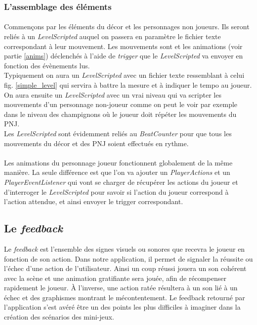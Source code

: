 \subsubsection{L'assemblage des éléments}

\paragraph{}
Commençons par les éléments du décor et les personnages non joueurs. Ils seront reliés à un \textit{LevelScripted} auquel on passera en paramètre le fichier texte correspondant à leur mouvement. Les mouvements sont et les animations (voir partie \ref{anims}) déclenchés à l'aide de \textit{trigger} que le \textit{LevelScripted} va envoyer en fonction des évènements lus. \\
Typiquement on aura un \textit{LevelScripted} avec un fichier texte ressemblant à celui fig. \ref{simple_level} qui servira à battre la mesure et à indiquer le tempo au joueur.\\
On aura ensuite un \textit{LevelScripted} avec un vrai niveau qui va scripter les mouvements d'un personnage non-joueur comme on peut le voir par exemple dans le niveau des champignons où le joueur doit répéter les mouvements du PNJ.\\
Les \textit{LevelScripted} sont évidemment reliés au \textit{BeatCounter} pour que tous les mouvements du décor et des PNJ soient effectués en rythme.

\paragraph{}
Les animations du personnage joueur fonctionnent globalement de la même manière. La seule différence est que l'on va ajouter un \textit{PlayerActions} et un \textit{PlayerEventListener} qui vont se charger de récupérer les actions du joueur et d'interroger le \textit{LevelScripted} pour savoir si l'action du joueur correspond à l'action attendue, et ainsi envoyer le trigger correspondant. 

\subsection{Le \textit{feedback}}

Le \textit{feedback} est l'ensemble des signes visuels ou sonores que recevra le joueur en fonction de son action. Dans notre application, il permet de signaler la réussite ou l'échec d'une action de l'utilisateur. Ainsi un coup réussi jouera un son cohérent avec la scène et une animation gratifiante sera jouée, afin de récompenser rapidement le joueur. À l'inverse, une action ratée résultera à un son lié à un échec et des graphismes montrant le mécontentement.
Le feedback retourné par l'application s'est avéré être un des points les plus difficiles à imaginer dans la création des scénarios des mini-jeux.

